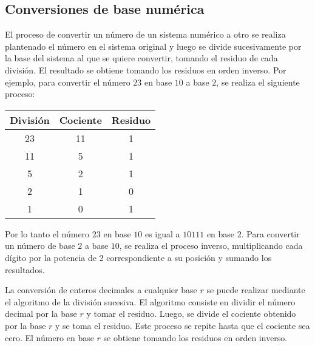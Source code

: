 \subsection{Conversiones de base numérica}
El proceso de convertir un número de un sistema numérico a otro se realiza plantenado el número en el sistema original y luego se divide sucesivamente por la base del sistema al que se quiere convertir, tomando el residuo de cada división. El resultado se obtiene tomando los residuos en orden inverso. Por ejemplo, para convertir el número $23$ en base $10$ a base $2$, se realiza el siguiente proceso:
\begin{table}[H]
    \centering
    \begin{tabular}{c|c|c}
        \textbf{División} & \textbf{Cociente} & \textbf{Residuo} \\ \hline
        23                & 11                & 1                \\
        11                & 5                 & 1                \\
        5                 & 2                 & 1                \\
        2                 & 1                 & 0                \\
        1                 & 0                 & 1
    \end{tabular}
\end{table}
Por lo tanto el número $23$ en base $10$ es igual a $10111$ en base $2$. Para convertir un número de base $2$ a base $10$, se realiza el proceso inverso, multiplicando cada dígito por la potencia de $2$ correspondiente a su posición y sumando los resultados.

\begin{observacion}
    La conversión de enteros decimales a cualquier base $r$ se puede realizar mediante el algoritmo de la división sucesiva. El algoritmo consiste en dividir el número decimal por la base $r$ y tomar el residuo. Luego, se divide el cociente obtenido por la base $r$ y se toma el residuo. Este proceso se repite hasta que el cociente sea cero. El número en base $r$ se obtiene tomando los residuos en orden inverso.
\end{observacion}

